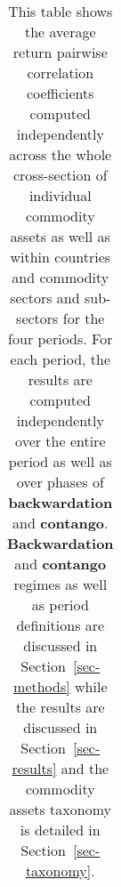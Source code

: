 \documentclass[
  authoryear,
  preprint,
  3p]{elsarticle}
\begin{document}
\begin{longtable}[t]{>{}l>{}l>{}l>{}r>{}r>{}r>{}r>{}r}

\caption{\label{tbl-correlations-inner-periods}This table shows the
average return pairwise correlation coefficients computed independently
across the whole cross-section of individual commodity assets as well as
within countries and commodity sectors and sub-sectors for the four
periods. For each period, the results are computed independently over
the entire period as well as over phases of \textbf{backwardation} and
\textbf{contango}. \textbf{Backwardation} and \textbf{contango} regimes
as well as period definitions are discussed in Section~\ref{sec-methods}
while the results are discussed in Section~\ref{sec-results} and the
commodity assets taxonomy is detailed in Section~\ref{sec-taxonomy}.}

\tabularnewline


\end{longtable}
\end{document}
